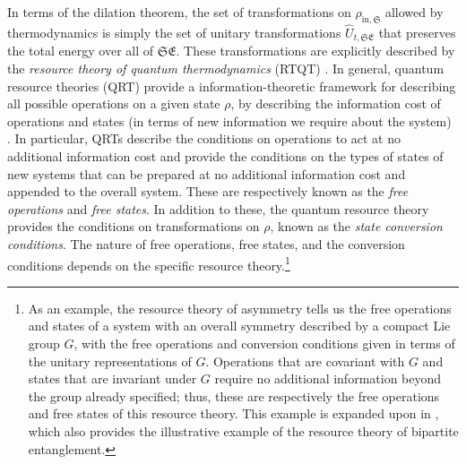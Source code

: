 \documentclass[preprints,article,accept,moreauthors,pdftex]{Definitions/mdpi}
\begin{document}
\begin{paracol}{2}
In terms of the dilation theorem, the set of transformations on $\rho_{\mathrm{in},\mathfrak{S}}$ allowed by thermodynamics is simply the set of unitary transformations $\widehat{U}_{t,\mathfrak{SE}}$ that preserves the total energy over all of $\mathfrak{SE}$. These transformations are explicitly described by the \emph{resource theory of quantum thermodynamics} (RTQT) \cite{NW18, Lostalgio19}. In general, quantum resource theories (QRT) provide a information-theoretic framework for describing all possible operations on a given state $\rho$, by describing the information cost of operations and states (in terms of new information we require about the system) \cite{CG19}. In particular, QRTs describe the conditions on operations to act at no additional information cost and provide the conditions on the types of states of new systems that can be prepared at no additional information cost and appended to the overall system. These are respectively known as the \emph{free operations} and \emph{free states}. In addition to these, the quantum resource theory provides the conditions on transformations on $\rho$, known as the \emph{state conversion conditions}. The nature of free operations, free states, and the conversion conditions depends on the specific resource theory.\footnote{As an example, the resource theory of asymmetry tells us the free operations and states of a system with an overall symmetry described by a compact Lie group $G$, with the free operations and conversion conditions given in terms of the unitary representations of $G$. Operations that are covariant with $G$ and states that are invariant under $G$ require no additional information beyond the group already specified; thus, these are respectively the free operations and free states of this resource theory. This example is expanded upon in \cite{CG19}, which also provides the illustrative example of the resource theory of bipartite entanglement.}


\end{paracol}
\end{document}
